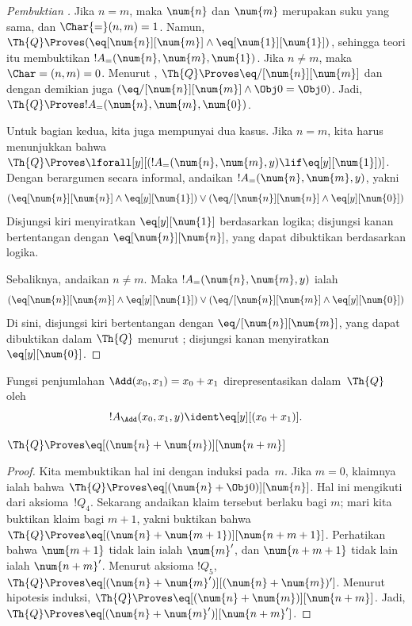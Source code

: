 \documentclass[../../../include/open-logic-section]{subfiles}
\begin{document}
\begin{proof}[Pembuktian ]
Jika $n = m$, maka $\num{n}$ dan $\num{m}$ merupakan suku yang sama, dan
$\Char{=}(n, m) = 1$. Namun, $\Th{Q} \Proves
(\eq[\num{n}][\num{m}] \land \eq[\num{1}][\num{1}])$, sehingga teori itu
membuktikan $!A_=(\num{n}, \num{m}, \num{1})$. Jika $n \neq m$, maka
$\Char=(n, m) = 0$. Menurut ,
$\Th{Q} \Proves \eq/[\num{n}][\num{m}]$ dan dengan demikian juga
$(\eq/[\num{n}][\num{m}] \land \Obj 0 = \Obj 0)$. Jadi,
$\Th{Q} \Proves !A_=(\num{n}, \num{m}, \num{0})$.

Untuk bagian kedua, kita juga mempunyai dua kasus. Jika $n = m$, kita harus
menunjukkan bahwa $\Th{Q} \Proves \lforall[y][(!A_=(\num{n}, \num{m}, y)
  \lif \eq[y][\num{1}])]$. Dengan berargumen secara informal, andaikan
$!A_=(\num{n}, \num{m}, y)$, yakni
\[
(\eq[\num{n}][\num{n}] \land \eq[y][\num{1}]) \lor
(\eq/[\num{n}][\num{n}] \land \eq[y][\num{0}])
\]
Disjungsi kiri menyiratkan $\eq[y][\num{1}]$ berdasarkan logika; disjungsi
kanan bertentangan dengan $\eq[\num{n}][\num{n}]$, yang dapat dibuktikan
berdasarkan logika.

Sebaliknya, andaikan $n \neq m$. Maka $!A_=(\num{n}, \num{m}, y)$ ialah
\[
(\eq[\num{n}][\num{m}] \land \eq[y][\num{1}]) \lor
(\eq/[\num{n}][\num{m}] \land \eq[y][\num{0}])
\]
Di sini, disjungsi kiri bertentangan dengan $\eq/[\num{n}][\num{m}]$, yang
dapat dibuktikan dalam $\Th{Q}$ menurut ; disjungsi
kanan menyiratkan $\eq[y][\num{0}]$.
\end{proof}

\begin{prop}
Fungsi penjumlahan $\Add(x_0, x_1) = x_0+x_1$ direpresentasikan
dalam~$\Th{Q}$ oleh
\[
  !A_{\Add}(x_0, x_1, y) \ident \eq[y][(x_0 + x_1)].
\]
\end{prop}

\begin{lem}
$\Th{Q} \Proves \eq[(\num{n} + \num{m})][\num{n+m}]$
\end{lem}

\begin{proof}
Kita membuktikan hal ini dengan induksi pada~$m$. Jika $m = 0$, klaimnya
ialah bahwa $\Th{Q} \Proves \eq[(\num{n} + \Obj 0)][\num{n}]$. Hal ini
mengikuti dari aksioma~$!Q_4$. Sekarang andaikan klaim tersebut berlaku bagi
$m$; mari kita buktikan klaim bagi $m+1$, yakni buktikan bahwa
$\Th{Q} \Proves \eq[(\num{n} + \num{m+1})][\num{n+m+1}]$. Perhatikan bahwa
$\num{m+1}$ tidak lain ialah $\num{m}'$, dan $\num{n+m+1}$ tidak lain ialah
$\num{n+m}'$. Menurut aksioma $!Q_5$,
$\Th{Q} \Proves \eq[(\num{n} + \num{m}')][(\num{n}+\num{m})']$. Menurut
hipotesis induksi, $\Th{Q} \Proves
\eq[(\num{n} + \num{m})][\num{n+m}]$. Jadi,
$\Th{Q} \Proves \eq[(\num{n} + \num{m}')][\num{n+m}']$.
\end{proof}
\end{document}

